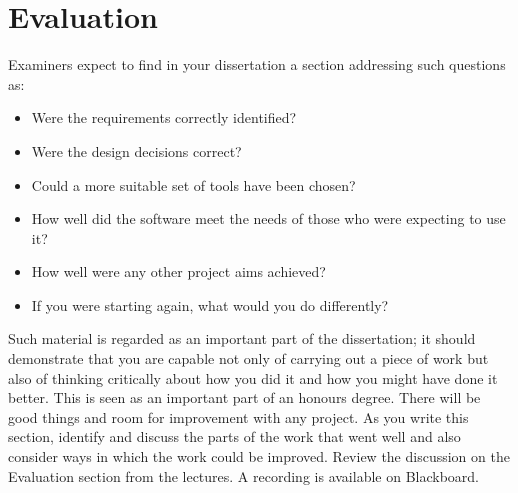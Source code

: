 \chapter{Evaluation}

Examiners expect to find in your dissertation a section addressing such questions as:

\begin{itemize}
   \item Were the requirements correctly identified? 
   \item Were the design decisions correct?
   \item Could a more suitable set of tools have been chosen?
   \item How well did the software meet the needs of those who were expecting to use it?
   \item How well were any other project aims achieved?
   \item If you were starting again, what would you do differently?
\end{itemize}

Such material is regarded as an important part of the dissertation; it should demonstrate that you are capable not only of carrying out a piece of work but also of thinking critically about how you did it and how you might have done it better. This is seen as an important part of an honours degree. There will be good things and room for improvement with any project. As you write this section, identify and discuss the parts of the work that went well and also consider ways in which the work could be improved. Review the discussion on the Evaluation section from the lectures. A recording is available on Blackboard. 
